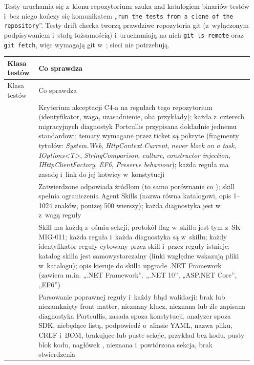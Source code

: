 Testy uruchamia się z~klonu repozytorium:  szuka
 nad katalogiem binariów testów i~bez niego kończy się komunikatem
„\texttt{run the tests from a clone of the repository}”. Testy drift checka tworzą
prawdziwe repozytoria git (z~wyłączonym podpisywaniem i~stałą tożsamością) i~uruchamiają na
nich \texttt{git ls-remote} oraz \texttt{git fetch}, więc wymagają git w~; sieci
nie potrzebują.

\begin{xltabular}{\linewidth}{@{}>{\raggedright\arraybackslash}p{5.1cm} >{\raggedright\arraybackslash}X@{}}
\toprule
Klasa testów & Co sprawdza \\
\midrule
\endfirsthead
\toprule
Klasa testów & Co sprawdza \\
\midrule
\endhead
{} & Kryterium akceptacji C4-a na regułach tego repozytorium (identyfikator, waga, uzasadnienie, oba przykłady); każda z~czterech migracyjnych diagnostyk Portcullis przypisana dokładnie jednemu standardowi; tematy wymagane przez ticket są pokryte (fragmenty tytułów: \emph{System.Web}, \emph{HttpContext.Current}, \emph{never block on a task}, \emph{IOptions<T>}, \emph{StringComparison}, \emph{culture}, \emph{constructor injection}, \emph{IHttpClientFactory}, \emph{EF6}, \emph{Preserve behaviour}); każda reguła  ma zasadę i~link do jej kotwicy w~konstytucji \\
 & Zatwierdzone  odpowiada źródłom (to samo porównanie co ); skill spełnia ograniczenia Agent Skills (nazwa równa katalogowi, opis 1--1024 znaków,  poniżej 500 wierszy); każda diagnostyka jest w~ z~wagą reguły \\
 & Skill ma każdą z~ośmiu sekcji; protokół flag w~skillu jest tym z~SK-MIG-011; każda reguła i~każda diagnostyka są w~skillu; każdy identyfikator reguły cytowany przez skill i~przez reguły istnieje; katalog skilla jest samowystarczalny (linki względne wskazują pliki w~katalogu); opis kieruje do skilla upgrade .NET Framework (zawiera m.in. „.NET Framework”, „.NET 10”, „ASP.NET Core”, „EF6”) \\
 & Parsowanie poprawnej reguły i~każdy błąd walidacji: brak lub niezamknięty front matter, nieznany klucz, nieznana lub źle zapisana diagnostyka Portcullis, zasada spoza konstytucji, analyzer spoza SDK,  niebędące listą, podpowiedź o~aliasie YAML, nazwa pliku, CRLF i~BOM, brakujące lub puste sekcje, przykład bez kodu, pusty blok kodu, nagłówek \repopath{\#}, nieznana i~powtórzona sekcja, brak stwierdzenia \\

\end{xltabular}

